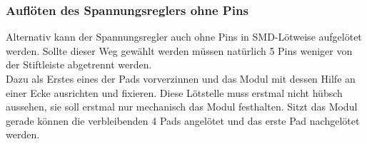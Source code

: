 \documentclass[12pt, a4paper]{article}		%
\begin{document}
\subsubsection{Auflöten des Spannungsreglers ohne Pins}
\label{sec:DCDCSMD}

Alternativ kann der Spannungsregler auch ohne Pins in SMD-Lötweise aufgelötet werden. Sollte dieser Weg gewählt werden müssen natürlich 5 Pins weniger von der Stiftleiste abgetrennt werden.\\
 Dazu als Erstes eines der Pads vorverzinnen und das Modul mit dessen Hilfe an einer Ecke ausrichten und fixieren. Diese Lötstelle muss erstmal nicht hübsch aussehen, sie soll erstmal nur mechanisch das Modul festhalten. Sitzt das Modul gerade können die verbleibenden 4 Pads angelötet und das erste Pad nachgelötet werden.
\end{document}
